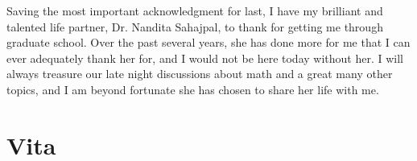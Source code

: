 \documentclass[final, leqno]{ukthesis}
\numberwithin{equation}{chapter}
\def\chzeroloc{Chapter0-Intro/Chapter0-Intro.tex}
\def\choneloc{Chapter1-GF/Chapter1-GF.tex}
\def\chtwoloc{Chapter2-GFmapping/Chapter2-GFmapping.tex}
\def\chthreeloc{Chapter3-xContin/Chapter3-xContin.tex}
\def\chfourloc{Chapter4-Jost/Chapter4-Jost.tex}
\def\apploc{Appendices/Appendices}
\def\bibloc{Bibliography/dissertation.bibliography}
\def\vitaloc{vita.tex}
\begin{document}
\begin{acknowledgments}
	Saving the most important acknowledgment for last, I have my brilliant and
	talented life partner, Dr. Nandita Sahajpal, to thank for getting me through
	graduate school. Over the past several years, she has done more for me 
	that I can ever adequately thank her for, and I would not be here today
	without her. I will always treasure our late night discussions about math
	and a great many other topics, and I am beyond fortunate she has chosen to 
	share her life with me.
\end{acknowledgments}

\begin{KeepFromToc}
	\clearpage
	\tableofcontents\clearpage
\end{KeepFromToc}
\listoffigures\clearpage




\mainmatter


\begin{DoubleSpace}















\end{DoubleSpace}

\backmatter

\begin{theappendices}
	
\end{theappendices}





\nocite{*}


\chapter{Vita}

\end{document}
